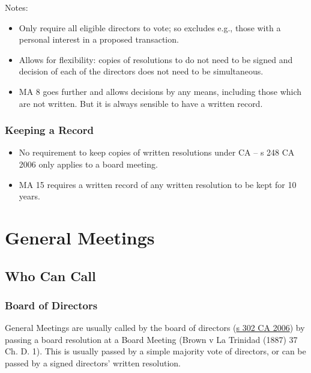 \documentclass[
]{article}
\providecommand{\tightlist}{%
  \setlength{\itemsep}{0pt}\setlength{\parskip}{0pt}}
\begin{document}
Notes:

\begin{itemize}
\tightlist
\item
  Only require all eligible directors to vote; so excludes e.g., those
  with a personal interest in a proposed transaction.
\item
  Allows for flexibility: copies of resolutions to do not need to be
  signed and decision of each of the directors does not need to be
  simultaneous.
\item
  MA 8 goes further and allows decisions by any means, including those
  which are not written. But it is always sensible to have a written
  record.
\end{itemize}

\hypertarget{keeping-a-record}{%
\subsubsection{Keeping a Record}\label{keeping-a-record}}

\begin{itemize}
\tightlist
\item
  No requirement to keep copies of written resolutions under CA -- s 248
  CA 2006 only applies to a board meeting.
\item
  MA 15 requires a written record of any written resolution to be kept
  for 10 years.
\end{itemize}

\hypertarget{general-meetings}{%
\section{General Meetings}\label{general-meetings}}

\hypertarget{who-can-call}{%
\subsection{Who Can Call}\label{who-can-call}}

\hypertarget{board-of-directors}{%
\subsubsection{Board of Directors}\label{board-of-directors}}

General Meetings are usually called by the board of directors
(\href{https://www.legislation.gov.uk/ukpga/2006/46/section/302}{s 302
CA 2006}) by passing a board resolution at a Board Meeting (Brown v La
Trinidad (1887) 37 Ch. D. 1). This is usually passed by a simple
majority vote of directors, or can be passed by a signed directors'
written resolution.
\end{document}
